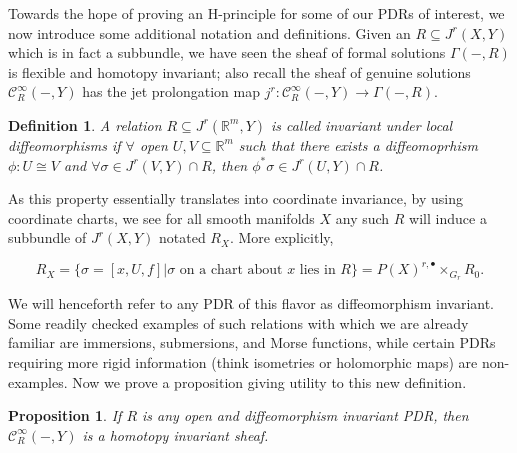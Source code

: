 \documentclass{article}
\newtheorem{proposition}[theorem]{Proposition}
\newtheorem{definition}[theorem]{Definition}
\newtheorem{proposed work}[theorem]{Proposed Work}
\begin{document}
Towards the hope of proving an H-principle for some of our PDRs of interest, we now introduce some additional notation and definitions. Given an $R \subseteq J^r(X,Y)$ which is in fact a subbundle, we have seen the sheaf of formal solutions $\Gamma (-,R)$ is flexible and homotopy invariant; also recall the sheaf of genuine solutions $\mathcal{C}^\infty_R(-,Y)$ has the jet prolongation map $j^r:\mathcal{C}^\infty_R(-,Y) \to \Gamma (-,R)$.

\begin{definition}
A relation $R \subseteq J^r(\mathbb{R}^m,Y)$ is called invariant under local diffeomorphisms if $\forall$ open $U,V \subseteq \mathbb{R}^m$ such that there exists a diffeomoprhism $\phi:U \cong V$ and $\forall \sigma \in J^r(V,Y) \cap R$, then $\phi^*\sigma \in J^r(U,Y) \cap R$.
\end{definition}

As this property essentially translates into coordinate invariance, by using coordinate charts, we see for all smooth manifolds $X$ any such $R$ will induce a subbundle of $J^r(X,Y)$ notated $R_X$. More explicitly,

\begin{equation*}
R_X = \{\sigma = [x,U,f]|\sigma \text{ on a chart about $x$ lies in } R\} = P(X)^{r,\bullet} \times_{G_r} R_0.
\end{equation*}

We will henceforth refer to any PDR of this flavor as diffeomorphism invariant. Some readily checked examples of such relations with which we are already familiar are immersions, submersions, and Morse functions, while certain PDRs requiring more rigid information (think isometries or holomorphic maps) are non-examples. Now we prove a proposition giving utility to this new definition.

\begin{proposition}
If $R$ is any open and diffeomorphism invariant PDR, then $\mathcal{C}^\infty_R(-,Y)$ is a homotopy invariant sheaf.
\end{proposition}
\end{document}
